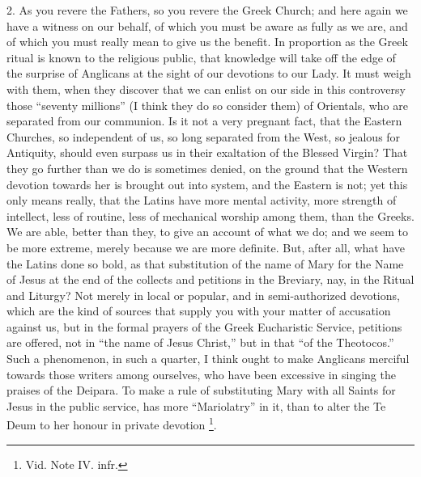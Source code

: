 2. As you revere the Fathers, so you revere the Greek Church; and
here again we have a witness on our behalf, of which you must be aware
as fully as we are, and of which you must really mean to give us the
benefit. In proportion as the Greek ritual is known to the religious
public, that knowledge will take off the edge of the surprise of
Anglicans at the sight of our devotions to our Lady. It must weigh with
them, when they discover that we can enlist on our side in this
controversy those ``seventy millions'' (I think they do so
consider them) of Orientals, who are separated from our communion. Is it
not a very pregnant fact, that the Eastern Churches, so independent of
us, so long separated from the West, so jealous for Antiquity, should
even surpass us in their exaltation of the Blessed Virgin? That they go
further than we do is sometimes denied, on the ground that the Western
devotion towards her is brought out into system, and the Eastern is not;
yet this only means really, that the Latins have more mental activity,
more strength of intellect, less of routine, less of mechanical
worship among them, than the Greeks. We are able, better than they, to
give an account of what we do; and we seem to be more extreme, merely
because we are more definite. But, after all, what have the Latins done
so bold, as that substitution of the name of Mary for the Name of Jesus
at the end of the collects and petitions in the Breviary, nay, in the
Ritual and Liturgy? Not merely in local or popular, and in
semi-authorized devotions, which are the kind of sources that supply you
with your matter of accusation against us, but in the formal prayers of
the Greek Eucharistic Service, petitions are offered, not in ``the
name of Jesus Christ,'' but in that ``of the Theotocos.''
Such a phenomenon, in such a quarter, I think ought to make Anglicans
merciful towards those writers among ourselves, who have been excessive
in singing the praises of the Deipara. To make a rule of substituting
Mary with all Saints for Jesus in the public service, has more
``Mariolatry'' in it, than to alter the Te Deum to her honour in
private devotion \footnote{Vid. Note IV. infr.}.

